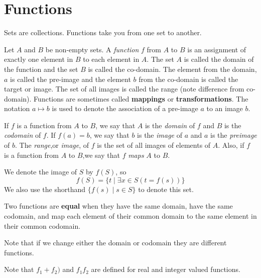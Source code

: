 
\chapter {Functions}
Sets are collections. Functions take you from one set to another.



\begin {definition} [Function]   
Let $A$ and $B$ be non-empty sets. A \textit{function} $f$ from $A$ to $B$ is an assignment of exactly one element in $B$ to each element in $A$. The set $A$ is called the domain of the function and the set $B$ is called the co-domain. The element from the domain, $a$ is called the pre-image and the element $b$ from the co-domain is called the target or image. The set of all images is called the range (note difference from co-domain). Functions are sometimes called \textbf{mappings} or \textbf{transformations}. The notation $a \mapsto b$ is used to denote the association of a pre-image $a$ to an image $b$.
\end {definition} 

\begin {definition} 
If $f$ is a function from $A$ to $B$, we say that $A$ is the \textit{domain} of $f$ and $B$ is the \textit{codomain} of $f$. If $f(a)=b$, we say that $b$ is the \textit{image} of $a$ and $a$ is the \textit{preimage} of $b$. The \textit{range},or \textit{image}, of $f$ is the set of all images of elements of $A$. Also, if $f$ is a function from $A$ to $B$,we say that $f$ \textit{maps} $A$ to $B$.

 We denote the image of $S$ by $f(S)$, so
 $$f(S)=\{t \mid \exists x \in S (t=f(s))\}$$
 We also use the shorthand $\{f(s) \mid s \in S\}$ to denote this set. 
\end {definition}

\begin {definition}
Two functions are \textbf{equal} when they have the same domain, have the same codomain, and map each element of their common domain to the same element in their common codomain.
\end {definition}
Note that if we change either the domain or codomain they are different functions.

Note that $f_1 + f_2)$ and $f_1 f_2$ are defined for real and integer valued functions.

